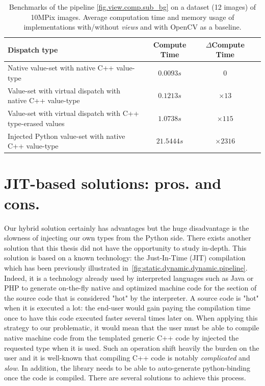 \begin{table}[htbp]
  \begin{tabular}{l|ccc}
    \toprule
    Dispatch type                                               & Compute Time & $\Delta{}$Compute Time \\ \midrule
    Native value-set with native C++ value-type                 & $0.0093s$    & $0$                    \\
    Value-set with virtual dispatch with native C++ value-type  & $0.1213s$    & $\times 13$            \\
    Value-set with virtual dispatch with C++ type-erased values & $1.0738s$    & $\times 115$           \\
    Injected Python value-set with native C++ value-type        & $21.5444s$   & $\times 2316$          \\
    \bottomrule
  \end{tabular}
  \caption{Benchmarks of the pipeline \cref{fig.view.comp.sub_bg} on a dataset (12 images) of 10MPix images. Average
    computation time and memory usage of implementations with/without \emph{views} and with OpenCV as a baseline.}
  \label{table:static.dynamic.perfs}
\end{table}

\section{JIT-based solutions: pros. and cons.}

Our hybrid solution certainly has advantages but the huge disadvantage is the slowness of injecting our own types from
the Python side. There exists another solution that this thesis did not have the opportunity to study in-depth. This
solution is based on a known technology: the Just-In-Time (JIT) compilation which has been previously illustrated
in~\cref{fig:static.dynamic.dynamic.pipeline}. Indeed, it is a technology already used by interpreted languages such as
Java or PHP to generate on-the-fly native and optimized machine code for the section of the source code that is
considered "hot" by the interpreter. A source code is "hot" when it is executed a lot: the end-user would gain paying
the compilation time once to have this code executed faster several times later on. When applying this strategy to our
problematic, it would mean that the user must be able to compile native machine code from the templated generic C++ code
by injected the requested type when it is used. Such an operation shift heavily the burden on the user and it is
well-known that compiling C++ code is notably \emph{complicated} and \emph{slow}. In addition, the library needs to be
able to auto-generate python-binding once the code is compiled. There are several solutions to achieve this process.


